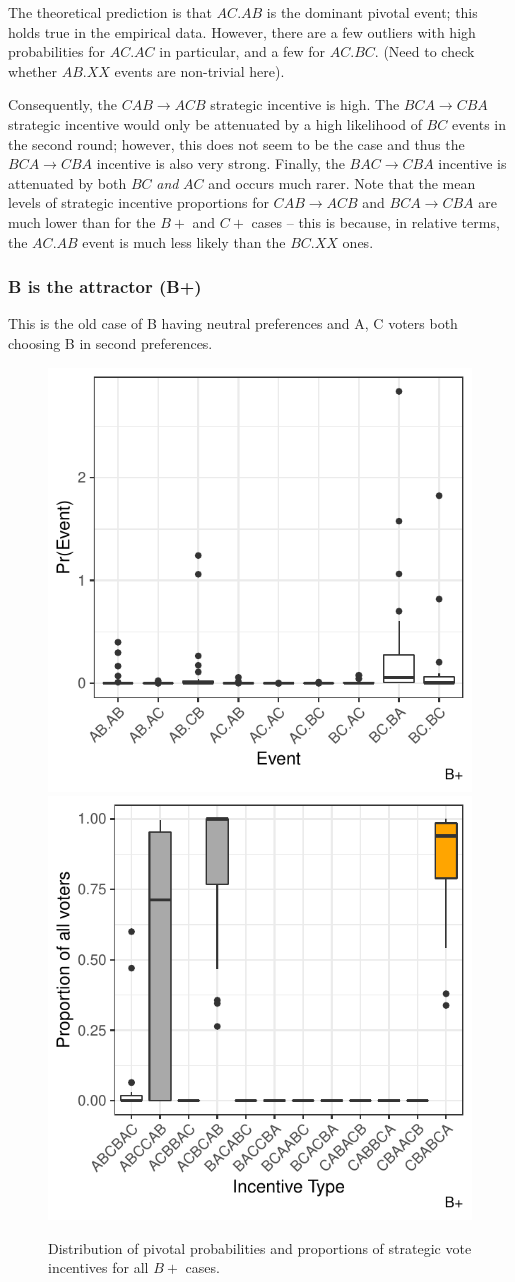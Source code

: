 \documentclass[11pt, letter]{article}
\begin{document}
The theoretical prediction is that $AC.AB$ is the dominant pivotal event; this holds true in the empirical data. However, there are a few outliers with high probabilities for $AC.AC$ in particular, and a few for $AC.BC$. (Need to check whether $AB.XX$ events are non-trivial here). 

Consequently, the $CAB \rightarrow ACB$ strategic incentive is high. The $BCA \rightarrow CBA$ strategic incentive would only be attenuated by a high likelihood of $BC$ events in the second round; however, this does not seem to be the case and thus the $BCA \rightarrow CBA$ incentive is also very strong. Finally, the $BAC \rightarrow CBA$ incentive is attenuated by both $BC$ \textit{and} $AC$ and occurs much rarer. Note that the mean levels of strategic incentive proportions for $CAB \rightarrow ACB$ and $BCA \rightarrow CBA$ are much lower than for the $B+$ and $C+$ cases -- this is because, in relative terms, the $AC.AB$ event is much less likely than the $BC.XX$ ones.

\subsubsection{B is the attractor (B+)}

This is the old case of B having neutral preferences and A, C voters both choosing B in second preferences.

\begin{figure}[!htb]
	\centering
	\includegraphics[width = .45\textwidth]{../output/figures/prediction/pprob_sp_b.pdf}
	\includegraphics[width = .45\textwidth]{../output/figures/prediction/svinc_sp_b.pdf}
	\caption{Distribution of pivotal probabilities and proportions of strategic vote incentives for all $B+$ cases.}
	\label{fig:figure1}
\end{figure}
\end{document}
